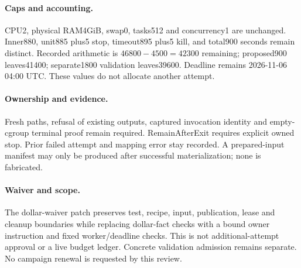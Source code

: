 \documentclass[10pt]{article}
\begin{document}
\paragraph{Caps and accounting.} CPU2, physical RAM4GiB, swap0, tasks512 and concurrency1 are unchanged. Inner880, unit885 plus5 stop, timeout895 plus5 kill, and total900 seconds remain distinct. Recorded arithmetic is $46800-4500=42300$ remaining; proposed900 leaves41400; separate1800 validation leaves39600. Deadline remains 2026-11-06 04:00 UTC. These values do not allocate another attempt.
\paragraph{Ownership and evidence.} Fresh paths, refusal of existing outputs, captured invocation identity and empty-cgroup terminal proof remain required. RemainAfterExit requires explicit owned stop. Prior failed attempt and mapping error stay recorded. A prepared-input manifest may only be produced after successful materialization; none is fabricated.
\paragraph{Waiver and scope.} The dollar-waiver patch preserves test, recipe, input, publication, lease and cleanup boundaries while replacing dollar-fact checks with a bound owner instruction and fixed worker/deadline checks. This is not additional-attempt approval or a live budget ledger. Concrete validation admission remains separate. No campaign renewal is requested by this review.
\end{document}
